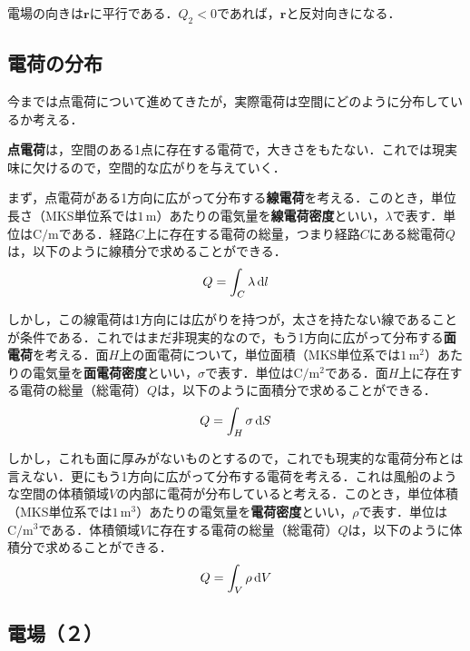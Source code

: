 電場の向きは$\bm{r}$に平行である．$Q_2 < 0$であれば，$\bm{r}$と反対向きになる．



\subsection{電荷の分布}

今までは点電荷について進めてきたが，実際電荷は空間にどのように分布しているか考える．

\textbf{点電荷}は，空間のある1点に存在する電荷で，大きさをもたない．これでは現実味に欠けるので，空間的な広がりを与えていく．

まず，点電荷がある1方向に広がって分布する\textbf{線電荷}を考える．このとき，単位長さ（MKS単位系では$1\,\mathrm{m}$）あたりの電気量を\textbf{線電荷密度}といい，$\lambda$で表す．単位は$\mathrm{C / m}$である．経路$C$上に存在する電荷の総量，つまり経路$C$にある総電荷$Q$は，以下のように線積分で求めることができる．
\begin{equation}
	Q = \int_{C} \lambda\,\mathrm{d} l
\end{equation}

しかし，この線電荷は1方向には広がりを持つが，太さを持たない線であることが条件である．これではまだ非現実的なので，もう1方向に広がって分布する\textbf{面電荷}を考える．面$H$上の面電荷について，単位面積（MKS単位系では$1\,\mathrm{m^2}$）あたりの電気量を\textbf{面電荷密度}といい，$\sigma$で表す．単位は$\mathrm{C / m^2}$である．面$H$上に存在する電荷の総量（総電荷）$Q$は，以下のように面積分で求めることができる．
\begin{equation}
	Q = \int_{H} \sigma\,\mathrm{d} S
\end{equation}

しかし，これも面に厚みがないものとするので，これでも現実的な電荷分布とは言えない．更にもう1方向に広がって分布する電荷を考える．これは風船のような空間の体積領域$V$の内部に電荷が分布していると考える．このとき，単位体積（MKS単位系では$1\,\mathrm{m^3}$）あたりの電気量を\textbf{電荷密度}といい，$\rho$で表す．単位は$\mathrm{C / m^3}$である．体積領域$V$に存在する電荷の総量（総電荷）$Q$は，以下のように体積分で求めることができる．
\begin{equation}
	Q = \int_{V} \rho\,\mathrm{d} V \label{equ:elec1-3}
\end{equation}



\subsection{電場（２）}

